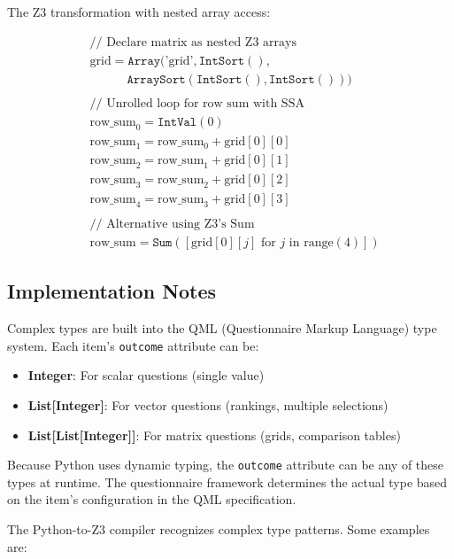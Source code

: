 The Z3 transformation with nested array access:

\begin{align*}
& \text{// Declare matrix as nested Z3 arrays} \\
& \text{grid} = \texttt{Array}(\text{'grid'}, \texttt{IntSort}(), \\
& \quad\quad\quad \texttt{ArraySort}(\texttt{IntSort}(), \texttt{IntSort}())) \\
\\
& \text{// Unrolled loop for row sum with SSA} \\
& \text{row\_sum}_0 = \texttt{IntVal}(0) \\
& \text{row\_sum}_1 = \text{row\_sum}_0 + \text{grid}[0][0] \\
& \text{row\_sum}_2 = \text{row\_sum}_1 + \text{grid}[0][1] \\
& \text{row\_sum}_3 = \text{row\_sum}_2 + \text{grid}[0][2] \\
& \text{row\_sum}_4 = \text{row\_sum}_3 + \text{grid}[0][3] \\
\\
& \text{// Alternative using Z3's Sum} \\
& \text{row\_sum} = \texttt{Sum}([\text{grid}[0][j] \text{ for } j \text{ in range}(4)])
\end{align*}

\subsection{Implementation Notes}

Complex types are built into the QML (Questionnaire Markup Language) type system. Each item's \texttt{outcome} attribute can be:

\begin{itemize}
    \item \textbf{Integer}: For scalar questions (single value)
    \item \textbf{List[Integer]}: For vector questions (rankings, multiple selections)
    \item \textbf{List[List[Integer]]}: For matrix questions (grids, comparison tables)
\end{itemize}

Because Python uses dynamic typing, the \texttt{outcome} attribute can be any of these types at runtime. The questionnaire framework determines the actual type based on the item's configuration in the QML specification.

The Python-to-Z3 compiler recognizes complex type patterns. Some examples are:

